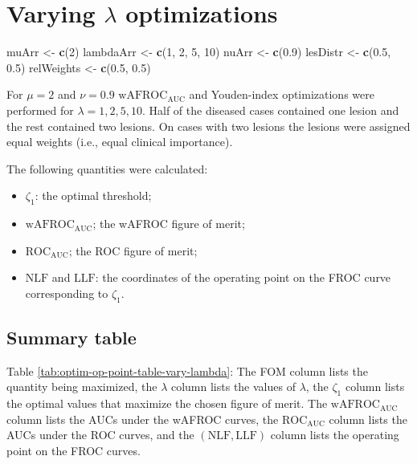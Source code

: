 \documentclass[
]{book}
\newenvironment{Shaded}{\begin{snugshade}}{\end{snugshade}}
\newcommand{\DecValTok}[1]{\textcolor[rgb]{0.00,0.00,0.81}{#1}}
\newcommand{\FloatTok}[1]{\textcolor[rgb]{0.00,0.00,0.81}{#1}}
\newcommand{\KeywordTok}[1]{\textcolor[rgb]{0.13,0.29,0.53}{\textbf{#1}}}
\newcommand{\NormalTok}[1]{#1}
\newcommand{\StringTok}[1]{\textcolor[rgb]{0.31,0.60,0.02}{#1}}
\begin{document}
\hypertarget{optim-op-point-vary-lambda}{%
\section{\texorpdfstring{Varying \(\lambda\) optimizations}{Varying \textbackslash lambda optimizations}}\label{optim-op-point-vary-lambda}}

\begin{Shaded}
\begin{Highlighting}[]
\NormalTok{muArr <-}\StringTok{ }\KeywordTok{c}\NormalTok{(}\DecValTok{2}\NormalTok{)}
\NormalTok{lambdaArr <-}\StringTok{ }\KeywordTok{c}\NormalTok{(}\DecValTok{1}\NormalTok{, }\DecValTok{2}\NormalTok{, }\DecValTok{5}\NormalTok{, }\DecValTok{10}\NormalTok{)}
\NormalTok{nuArr <-}\StringTok{ }\KeywordTok{c}\NormalTok{(}\FloatTok{0.9}\NormalTok{)}
\NormalTok{lesDistr <-}\StringTok{ }\KeywordTok{c}\NormalTok{(}\FloatTok{0.5}\NormalTok{, }\FloatTok{0.5}\NormalTok{)}
\NormalTok{relWeights <-}\StringTok{ }\KeywordTok{c}\NormalTok{(}\FloatTok{0.5}\NormalTok{, }\FloatTok{0.5}\NormalTok{)}
\end{Highlighting}
\end{Shaded}

For \(\mu = 2\) and \(\nu = 0.9\) \(\text{wAFROC}_\text{AUC}\) and Youden-index optimizations were performed for \(\lambda = 1, 2, 5, 10\). Half of the diseased cases contained one lesion and the rest contained two lesions. On cases with two lesions the lesions were assigned equal weights (i.e., equal clinical importance).

The following quantities were calculated:

\begin{itemize}
\item
  \(\zeta_1\): the optimal threshold;
\item
  \(\text{wAFROC}_\text{AUC}\); the wAFROC figure of merit;
\item
  \(\text{ROC}_\text{AUC}\); the ROC figure of merit;
\item
  \(\text{NLF}\) and \(\text{LLF}\): the coordinates of the operating point on the FROC curve corresponding to \(\zeta_1\).
\end{itemize}

\hypertarget{summary-table}{%
\subsection{Summary table}\label{summary-table}}

Table \ref{tab:optim-op-point-table-vary-lambda}: The FOM column lists the quantity being maximized, the \(\lambda\) column lists the values of \(\lambda\), the \(\zeta_1\) column lists the optimal values that maximize the chosen figure of merit. The \(\text{wAFROC}_\text{AUC}\) column lists the AUCs under the wAFROC curves, the \(\text{ROC}_\text{AUC}\) column lists the AUCs under the ROC curves, and the \(\left( \text{NLF}, \text{LLF}\right)\) column lists the operating point on the FROC curves.
\end{document}
